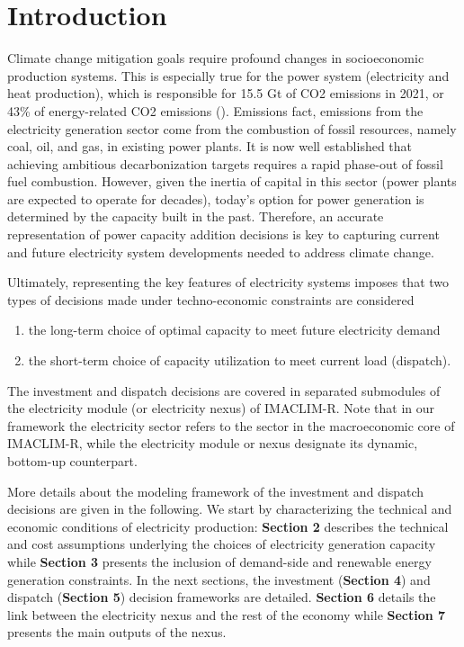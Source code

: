 \section{Introduction}
Climate change mitigation goals require profound changes in socioeconomic production systems. This is especially true for the power system (electricity and heat production), which is responsible for 15.5 Gt of CO2 emissions in 2021, or 43\% of energy-related CO2 emissions (\cite{IEA2021}). Emissions fact, emissions from the electricity generation sector come from the combustion of fossil resources, namely coal, oil, and gas, in existing power plants. It is now well established that achieving ambitious decarbonization targets requires a rapid phase-out of fossil fuel combustion. However, given the inertia of capital in this sector (power plants are expected to operate for decades), today's option for power generation is determined by the capacity built in the past. Therefore, an accurate representation of power capacity addition decisions is key to capturing current and future electricity system developments needed to address climate change.


Ultimately, representing the key features of electricity systems imposes that two types of decisions made under techno-economic constraints are considered
\begin{enumerate}
    \item the long-term choice of optimal capacity to meet future electricity demand
    \item the short-term choice of capacity utilization to meet current load (dispatch).
\end{enumerate}
The investment and dispatch decisions are covered in separated submodules of the electricity module (or electricity nexus) of IMACLIM-R. Note that in our framework the electricity sector refers to the sector in the macroeconomic core of IMACLIM-R, while the electricity module or nexus designate its dynamic, bottom-up counterpart.

More details about the modeling framework of the investment and dispatch decisions are given in the following. We start by characterizing the technical and economic conditions of electricity production:  \textbf{Section 2} describes the technical and cost assumptions underlying the choices of electricity generation capacity while \textbf{Section 3} presents the inclusion of demand-side and renewable energy generation constraints. In the next sections, the investment (\textbf{Section 4}) and dispatch (\textbf{Section 5}) decision frameworks are detailed. \textbf{Section 6}  details the link between the electricity nexus and the rest of the economy while \textbf{Section 7} presents the main outputs of the nexus.

